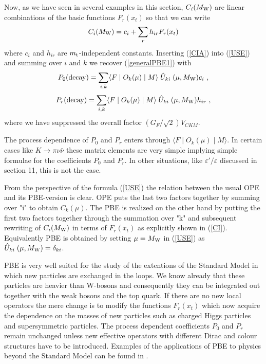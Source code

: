 \documentclass[12pt,rotate]{article}
\def\epe{\varepsilon'/\varepsilon}
\newcommand{\mt}{m_{\rm t}}
\newcommand{\mw}{M_{\rm W}}
\newcommand{\be}{\begin{equation}}
\newcommand{\ee}{\end{equation}}
\begin{document}
\begin{itemize}
\begin{itemize}
Now, as we have seen in several examples in this section,
$C_i(\mw)$ are linear combinations of the basic functions
$F_r(x_t)$ so that we can write
\be\label{CIA}
C_i(\mw)=c_i+\sum_r h_{ir} F_r(x_t)
\ee
where $c_i$ and $h_{ir}$ are $\mt$-independent constants. 
Inserting (\ref{CIA})
into (\ref{USE}) and summing over $i$ and $k$ we recover
(\ref{generalPBE1}) with
\be\label{PBE8}
P_0({\rm decay})= \sum_{i,k} \langle F\mid O_k(\mu)\mid M\rangle 
\;\hat U_{ki}\;(\mu,\mw)c_i~,
\ee 
\be\label{PBE9}
P_r({\rm decay})= \sum_{i,k} \langle F\mid O_k(\mu)\mid M\rangle 
\;\hat U_{ki}\;(\mu,\mw)h_{ir}~,
\ee 
where we have suppressed the overall factor $(G_F/\sqrt{2})V_{CKM}$.

The process dependence of $P_0$ and $P_r$ enters through
$\langle F\mid O_k(\mu)\mid M\rangle$. In certain cases like
$K\to\pi\nu\bar\nu$ these matrix elements are very simple implying
simple formulae for the coefficients $P_0$ and $P_r$. In other
situations, like $\epe$ discussed in section 11, this is not the
case.

From the perspective of the formula (\ref{USE}) the relation between
the usual OPE and its PBE-version is clear. OPE puts the last two
factors together by summing over "i" to obtain $C_k(\mu)$. The
PBE is realized on the other hand by putting the first two factors
together through the summation over "k" and subsequent rewriting
of $C_i(\mw)$ in terms of $F_r(x_t)$ as explicitly shown in
(\ref{CI}). Equivalently PBE is obtained by setting $\mu=\mw$
in (\ref{USE}) as $\hat U_{ki}\;(\mu,\mw)=\delta_{ki}$.

PBE is very well suited for the study of the extentions of the
Standard Model in which new particles are exchanged in the loops.
We know already that these particles are heavier than W-bosons
and consequently they can be integrated out together with
the weak bosons and the top quark. If there are no new local operators
the mere change is to modify the functions $F_r(x_t)$ which now
acquire the dependence on the masses of new particles such as
charged Higgs particles and supersymmetric particles. The process
dependent coefficients $P_0$ and $P_r$ remain unchanged unless
new effective operators with different Dirac and colour structures
have to be introduced. Examples of the applications of PBE to physics
beyond the Standard Model can be found in \cite{BBHLS,MW96,AAA}.


\end{itemize}
\end{itemize}
\end{document}
